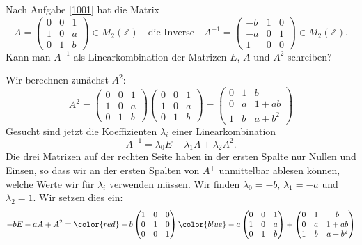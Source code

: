 Nach Aufgabe \ref{1001} hat die Matrix 
\[
A
=
\begin{pmatrix}
0&0&1\\
1&0&a\\
0&1&b
\end{pmatrix}
\in
M_2(\mathbb{Z})
\quad\text{die Inverse}\quad
A^{-1}
=
\begin{pmatrix}
-b&1&0\\
-a&0&1\\
1&0&0
\end{pmatrix}
\in
M_2(\mathbb{Z}).
\]
Kann man $A^{-1}$ als Linearkombination der Matrizen $E$, $A$ und $A^2$
schreiben?

\begin{loesung}
Wir berechnen zunächst $A^2$:
\[
A^2
=
\begin{pmatrix}
0&0&1\\
1&0&a\\
0&1&b
\end{pmatrix}
\begin{pmatrix}
0&0&1\\
1&0&a\\
0&1&b
\end{pmatrix}
=
\begin{pmatrix}
0&1&b\\
0&a&1+ab\\
1&b&a+b^2
\end{pmatrix}
\]
Gesucht sind jetzt die Koeffizienten
$\lambda_i$ einer Linearkombination
\[
A^{-1} = \lambda_0 E + \lambda_1 A + \lambda_2 A^2.
\]
Die drei Matrizen auf der rechten Seite haben in der ersten
Spalte nur Nullen und Einsen, so dass wir an der ersten Spalten von
$A^{+}$ unmittelbar ablesen können, welche Werte wir für $\lambda_i$
verwenden müssen.
Wir finden $\lambda_0=-b$, $\lambda_1=-a$ und $\lambda_2=1$.
Wir setzen dies ein:
\begin{align*}
-bE-aA+A^2
&=
{\color{red}-b}
\begin{pmatrix}
1&0&0\\
0&1&0\\
0&0&1
\end{pmatrix}
{\color{blue}-a}
\begin{pmatrix}
0&0&1\\
1&0&a\\
0&1&b
\end{pmatrix}
+
\begin{pmatrix}
0&1&b\\
0&a&1+ab\\
1&b&a+b^2
\end{pmatrix}
\\

\end{align*}
\end{loesung}
